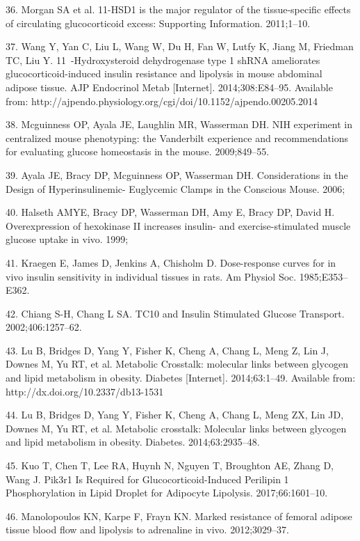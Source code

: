 \documentclass[11pt]{article} %
\begin{document}
36. Morgan SA et al. 11-HSD1 is the major regulator of the
tissue-specific effects of circulating glucocorticoid excess: Supporting
Information. 2011;1--10.

37. Wang Y, Yan C, Liu L, Wang W, Du H, Fan W, Lutfy K, Jiang M,
Friedman TC, Liu Y. 11~-Hydroxysteroid dehydrogenase type 1 shRNA
ameliorates glucocorticoid-induced insulin resistance and lipolysis in
mouse abdominal adipose tissue. AJP Endocrinol Metab {[}Internet{]}.
2014;308:E84--95. Available from:
http://ajpendo.physiology.org/cgi/doi/10.1152/ajpendo.00205.2014

38. Mcguinness OP, Ayala JE, Laughlin MR, Wasserman DH. NIH experiment
in centralized mouse phenotyping: the Vanderbilt experience and
recommendations for evaluating glucose homeostasis in the mouse.
2009;849--55.

39. Ayala JE, Bracy DP, Mcguinness OP, Wasserman DH. Considerations in
the Design of Hyperinsulinemic- Euglycemic Clamps in the Conscious
Mouse. 2006;

40. Halseth AMYE, Bracy DP, Wasserman DH, Amy E, Bracy DP, David H.
Overexpression of hexokinase II increases insulin- and
exercise-stimulated muscle glucose uptake in vivo. 1999;

41. Kraegen E, James D, Jenkins A, Chisholm D. Dose-response curves for
in vivo insulin sensitivity in individual tissues in rats. Am Physiol
Soc. 1985;E353--E362.

42. Chiang S-H, Chang L SA. TC10 and Insulin  Stimulated Glucose
Transport. 2002;406:1257--62.

43. Lu B, Bridges D, Yang Y, Fisher K, Cheng A, Chang L, Meng Z, Lin J,
Downes M, Yu RT, et al. Metabolic Crosstalk: molecular links between
glycogen and lipid metabolism in obesity. Diabetes {[}Internet{]}.
2014;63:1--49. Available from: http://dx.doi.org/10.2337/db13-1531

44. Lu B, Bridges D, Yang Y, Fisher K, Cheng A, Chang L, Meng ZX, Lin
JD, Downes M, Yu RT, et al. Metabolic crosstalk: Molecular links between
glycogen and lipid metabolism in obesity. Diabetes. 2014;63:2935--48.

45. Kuo T, Chen T, Lee RA, Huynh N, Nguyen T, Broughton AE, Zhang D,
Wang J. Pik3r1 Is Required for Glucocorticoid-Induced Perilipin 1
Phosphorylation in Lipid Droplet for Adipocyte Lipolysis.
2017;66:1601--10.

46. Manolopoulos KN, Karpe F, Frayn KN. Marked resistance of femoral
adipose tissue blood flow and lipolysis to adrenaline in vivo.
2012;3029--37.
\end{document}
